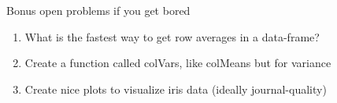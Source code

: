 \documentclass[10pt]{beamer}\usepackage[]{graphicx}\usepackage[]{color}
\begin{document}
\begin{frame}{}

\end{frame}
\begin{frame}{Bonus open problems if you get bored}
  \begin{enumerate}
    \item What is the fastest way to get row averages in a data-frame?
    \item Create a function called colVars, like colMeans but for variance
    \item Create nice plots to visualize iris data (ideally journal-quality)
  \end{enumerate}
  
\end{frame}
\end{document}
